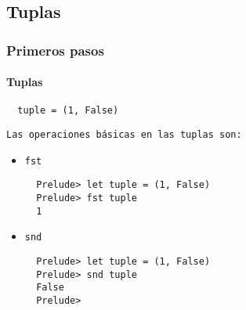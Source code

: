 \subsection{Tuplas}
\begin{frame}[fragile]
  \frametitle{Primeros pasos}
  \framesubtitle{Tuplas}
  {\color{white}
    \begin{verbatim}
  tuple = (1, False)
  \end{verbatim}
  }
  \texttt{Las operaciones básicas en las tuplas son:}
  \begin{itemize}
  \item \verb~fst~
    {\color{white}
      \begin{verbatim}
  Prelude> let tuple = (1, False)
  Prelude> fst tuple
  1
    \end{verbatim}
    }
  \item \verb~snd~
    {\color{white}
      \begin{verbatim}
  Prelude> let tuple = (1, False)
  Prelude> snd tuple
  False
  Prelude>
    \end{verbatim}
    }
  \end{itemize}
\end{frame}
